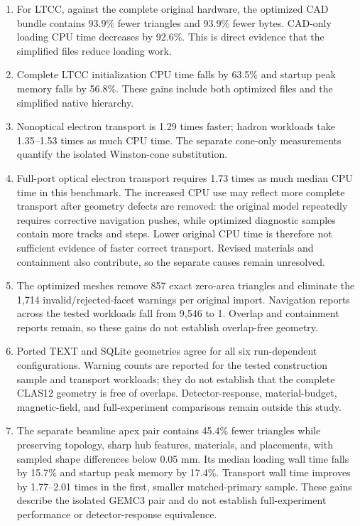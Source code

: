 \begin{enumerate}

\item For LTCC, against the complete original hardware, the optimized CAD bundle contains 93.9\% fewer
triangles and 93.9\% fewer bytes. CAD-only loading CPU time decreases by 92.6\%. This is direct evidence
that the simplified files reduce loading work.

\item Complete LTCC initialization CPU time falls by 63.5\% and startup peak memory falls by 56.8\%. These
gains include both optimized files and the simplified native hierarchy.

\item Nonoptical electron transport is 1.29 times faster; hadron workloads take 1.35--1.53 times as much CPU
time. The separate cone-only measurements quantify the isolated Winston-cone substitution.

\item Full-port optical electron transport requires 1.73 times as much median CPU time in this benchmark. The
increased CPU use may reflect more complete transport after geometry defects are removed: the original model
repeatedly requires corrective navigation pushes, while optimized diagnostic samples contain more tracks and
steps. Lower original CPU time is therefore not sufficient evidence of faster correct transport. Revised
materials and containment also contribute, so the separate causes remain unresolved.

\item The optimized meshes remove 857 exact zero-area triangles and eliminate the 1,714 invalid/rejected-facet
warnings per original import. Navigation reports across the tested workloads fall from 9,546 to 1. Overlap and
containment reports remain, so these gains do not establish overlap-free geometry.

\item Ported TEXT and SQLite geometries agree for all six run-dependent configurations. Warning counts are
reported for the tested construction sample and transport workloads; they do not establish that the complete
CLAS12 geometry is free of overlaps. Detector-response, material-budget, magnetic-field, and full-experiment
comparisons remain outside this study.

\item The separate beamline apex pair contains 45.4\% fewer triangles while preserving topology, sharp hub
features, materials, and placements, with sampled shape differences below 0.05 mm. Its median loading wall
time falls by 15.7\% and startup peak memory by 17.4\%. Transport wall time improves by 1.77--2.01 times in
the first, smaller matched-primary sample. These gains describe the isolated GEMC3 pair and do not establish
full-experiment performance or detector-response equivalence.


\end{enumerate}
